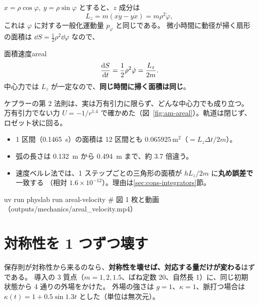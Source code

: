$x=\rho\cos\varphi,\ y=\rho\sin\varphi$ とすると、$z$ 成分は
\begin{equation}
  L_z=m(x\dot y-y\dot x)=m\rho^2\dot\varphi,
\end{equation}
これは $\varphi$ に対する一般化運動量 $p_\varphi$ と同じである。
微小時間に動径が掃く扇形の面積は $\dd S=\tfrac12\rho^2\dd\varphi$ なので、
\begin{result}{面積速度}{areal}
\begin{equation}
  \frac{\mathrm{d} S}{\mathrm{d} t}=\frac12\rho^2\dot\varphi=\frac{L_z}{2m}.
\end{equation}
中心力では $L_z$ が一定なので、\textbf{同じ時間に掃く面積は同じ}。
\end{result}
ケプラーの第 2 法則は、実は万有引力に限らず、どんな中心力でも成り立つ。
万有引力でない力 $U=-1/r^{1.4}$ で確かめた（図~\ref{fig:am-areal}）。軌道は閉じず、ロゼット状に回る。


\begin{itemize}
  \item 1 区間（\qty{0.1465}{s}）の面積は 12 区間とも $0.065925\,\mathrm{m^2}$（$=L_z\Delta t/2m$）。
  \item 弧の長さは \qty{0.132}{m} から \qty{0.494}{m} まで、約 3.7 倍違う。
  \item 速度ベルレ法では、1 ステップごとの三角形の面積が $hL_z/2m$ に\textbf{丸め誤差で}一致する
    （相対 $1.6\times10^{-12}$）。理由は\ref{sec:cons-integrators}節。
\end{itemize}

\begin{simbox}
\begin{terminal}
uv run physlab run areal-velocity      # 図 1 枚と動画（outputs/mechanics/areal_velocity.mp4）
\end{terminal}
\end{simbox}

\section{対称性を 1 つずつ壊す}\label{sec:cons-experiment}

保存則が対称性から来るのなら、\textbf{対称性を壊せば、対応する量だけが変わる}はずである。
導入の 3 質点（$m=1,2,1.5$、ばね定数 20、自然長 1）に、同じ初期状態から 4 通りの外場をかけた。
外場の強さは $g=1$、$\kappa=1$、脈打つ場合は $\kappa(t)=1+0.5\sin1.3t$ とした（単位は無次元）。

